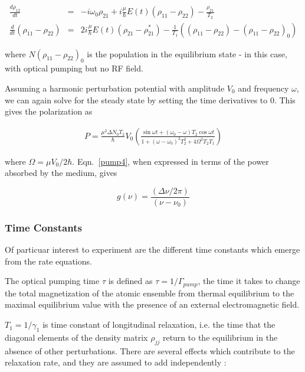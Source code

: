 \begin{eqnarray}
\frac{d\rho_{12}}{dt} &=& -i\omega_0\rho_{21} + i\frac{\mu}{\hbar}E(t)(\rho_{11} - \rho_{22}) - \frac{\rho_{21}}{T_2}\\
\frac{d}{dt}(\rho_{11} - \rho_{22}) &=& 2i\frac{\mu}{\hbar}E(t)(\rho_{21} - \rho_{21}^*) - \frac{1}{T_1}((\rho_{11} - \rho_{22}) - (\rho_{11} - \rho_{22})_0)
\label{pump3}
\end{eqnarray}

where $N(\rho_{11} - \rho_{22})_0$ is the population in the
equilibrium state - in this case, with optical pumping but no RF
field.

Assuming a harmonic perturbation potential with amplitude $V_0$ and
frequency $\omega$, we can again solve for the steady state by setting
the time derivatives to $0$. This gives the polarization as

\begin{eqnarray}
P = \frac{\mu^2\Delta N_0 T_2}{\hbar}V_0\left(\frac{\sin\omega t + (\omega_0 - \omega)T_2\cos\omega t}{1 + (\omega - \omega_0)^2T_2^2 + 4\Omega^2T_2T_1}\right)
\label{pump4}
\end{eqnarray}

where $\Omega = \mu V_0/2\hbar$. Eqn.~\ref{pump4}, when expressed in
terms of the power absorbed by the medium, gives 

\begin{equation}
g(\nu) = \frac{(\Delta\nu/2\pi)}{(\nu-\nu_0)}
\label{eqn:gamma1}
\end{equation}

\subsubsection{Time Constants}

Of particuar interest to experiment are the different time constants
which emerge from the rate equations. 

The optical pumping time $\tau$ is defined as $\tau =
1/\Gamma_{pump}$, the time it takes to change the total magnetization
of the atomic ensemble from thermal equilibrium to the maximal
equilibrium value with the presence of an external electromagnetic
field.

$T_1 = 1/\gamma_1$ is time constant of longitudinal relaxation,
i.e. the time that the diagonal elements of the density matrix
$\rho_{jj}$ return to the equilibrium in the absence of other
perturbations. There are several effects which contribute to the
relaxation rate, and they are assumed to add independently
\cite{vanier}:

